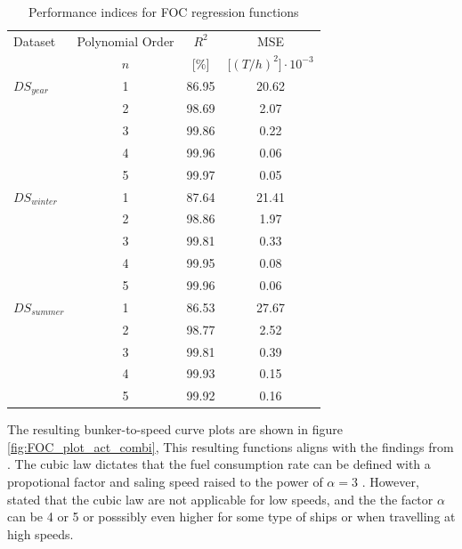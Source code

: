 \begin{table}[h]
    \small
    \centering
    {\begin{tabular}{ l c c c }
    \hline
    Dataset  & Polynomial Order & $R^2$ & MSE \\
    & $n$ & [$\%$] & [$(T/h)^2] \cdot 10^{-3}$ \\ 
    \hline
    $DS_{year}$ & 1 & 86.95 & 20.62 \\
     & 2 & 98.69 & 2.07 \\  
     & 3 & 99.86 & 0.22 \\
     & 4 & 99.96 & 0.06 \\
     & 5 & 99.97 & 0.05 \\
     $DS_{winter}$ & 1 & 87.64 & 21.41 \\
     & 2 & 98.86 & 1.97 \\  
     & 3 & 99.81 & 0.33 \\
     & 4 & 99.95 & 0.08 \\
     & 5 & 99.96 & 0.06 \\
     $DS_{summer}$ & 1 & 86.53 & 27.67 \\
     & 2 & 98.77 & 2.52 \\  
     & 3 & 99.81 & 0.39 \\
     & 4 & 99.93 & 0.15 \\
     & 5 & 99.92 & 0.16 \\
    \hline
    \end{tabular}}
\caption{Performance indices for FOC regression functions}\label{tbl:polyfit_scores_errors}
\end{table}

The resulting bunker-to-speed curve plots are shown in figure \cref{fig:FOC_plot_act_combi}, This resulting functions aligns with the findings from . The cubic law dictates that the fuel consumption rate can be defined with a propotional factor and saling speed raised to the power of $\alpha = 3$ . However,  stated that the cubic law are not applicable for low speeds, and the the factor $\alpha$ can be 4 or 5 or posssibly even higher for some type of ships or when travelling at high speeds.\\ 


